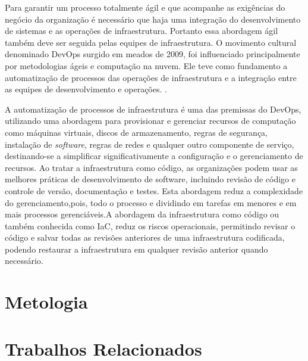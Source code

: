 Para garantir um processo totalmente ágil e que acompanhe as exigências do negócio da organização é necessário que haja uma integração do desenvolvimento de sistemas e as operações de infraestrutura. Portanto essa abordagem ágil também deve ser seguida pelas equipes de infraestrutura.
O movimento cultural denominado DevOps surgido em meados de 2009, foi influenciado principalmente por metodologias ágeis e computação na nuvem. Ele teve como fundamento a automatização de processos das operações de infraestrutura e a integração entre as equipes de desenvolvimento e operações. \cite{sato}.

A automatização de processos de infraestrutura é uma das premissas do DevOps, utilizando uma abordagem para provisionar e gerenciar recursos de computação como máquinas virtuais, discos de armazenamento, regras de segurança, instalação de \textit{software}, regras de redes e qualquer outro componente de serviço, destinando-se a simplificar significativamente a configuração e o gerenciamento de recursos. Ao tratar a infraestrutura como código, as organizações podem usar as melhores práticas de desenvolvimento de software, incluindo revisão de código e controle de versão, documentação e testes. Esta abordagem reduz a complexidade do gerenciamento,pois, todo o processo e dividindo em tarefas em menores e em mais processos gerenciáveis.A abordagem da infraestrutura como código ou também conhecida como IaC, reduz os riscos operacionais, permitindo revisar o código e salvar todas as revisões anteriores de uma infraestrutura codificada, podendo restaurar a infraestrutura em qualquer revisão anterior quando necessário.


\section{\esp Metologia}


\section{\esp Trabalhos Relacionados} \label{relacionados}



